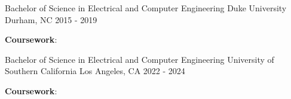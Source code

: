 
\begin{cventries}
  \cventry
    {Bachelor of Science in Electrical and Computer Engineering} %
    {Duke University} %
    {Durham, NC} %
    {2015 - 2019} %
    {
      \begin{cvitems} %
         \item {\textbf{Coursework}: 
         }
      \end{cvitems}
    }
\cventry
    {Bachelor of Science in Electrical and Computer Engineering} %
    {University of Southern California} %
    {Los Angeles, CA} %
    {2022 - 2024} %
    {
      \begin{cvitems} %
         \item {\textbf{Coursework}: 
         }
      \end{cvitems}
    }
\end{cventries}

